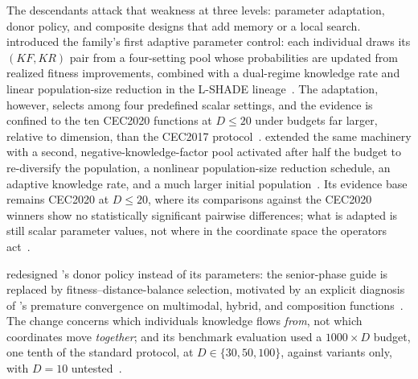 The descendants attack that weakness at three levels: parameter
adaptation, donor policy, and composite designs that add memory or a
local search. \agsk{} introduced the family's first adaptive parameter
control: each individual draws its $(KF, KR)$ pair from a
four-setting pool whose probabilities are updated from realized fitness
improvements, combined with a dual-regime knowledge rate and linear
population-size reduction in the L-SHADE
lineage~\cite{mohamed2020agsk,tanabe2014improving}. %
The adaptation, however, selects among four predefined scalar settings,
and the evidence is confined to the ten CEC2020 functions at
$D \leq 20$ under budgets far larger, relative to dimension, than the
CEC2017 protocol~\cite{mohamed2020agsk}. %
\apgsk{} extended the same machinery with a second,
negative-knowledge-factor pool activated after half the budget to
re-diversify the population, a nonlinear population-size reduction
schedule, an adaptive knowledge rate, and a much larger initial
population~\cite{apgsk2021}. %
Its evidence base remains CEC2020 at $D \leq 20$, where its comparisons
against the CEC2020 winners show no statistically significant pairwise
differences; what is adapted is still scalar parameter values, not where
in the coordinate space the operators
act~\cite{apgsk2021}. %

\fdbagsk{} redesigned \agsk{}'s donor policy instead of its parameters:
the senior-phase guide is replaced by fitness--distance-balance
selection, motivated by an explicit diagnosis of \agsk{}'s premature
convergence on multimodal, hybrid, and composition
functions~\cite{fdbagsk2023}. %
The change concerns which individuals knowledge flows \emph{from}, not
which coordinates move \emph{together}; and its benchmark evaluation
used a $1000 \times D$ budget, one tenth of the standard protocol,
at $D \in \{30, 50, 100\}$, against \agsk{} variants only, with $D = 10$
untested~\cite{fdbagsk2023}. %

